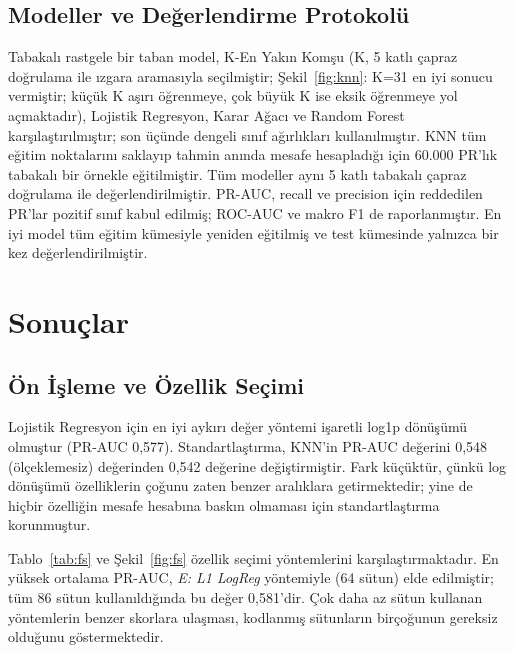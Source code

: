 \documentclass[conference]{IEEEtran}
\begin{document}
\subsection{Modeller ve Değerlendirme Protokolü}
Tabakalı rastgele bir taban model, K-En Yakın Komşu (K, 5 katlı çapraz doğrulama ile ızgara aramasıyla seçilmiştir; Şekil~\ref{fig:knn}: K=31 en iyi sonucu vermiştir; küçük K aşırı öğrenmeye, çok büyük K ise eksik öğrenmeye yol açmaktadır), Lojistik Regresyon, Karar Ağacı ve Random Forest karşılaştırılmıştır; son üçünde dengeli sınıf ağırlıkları kullanılmıştır. KNN tüm eğitim noktalarını saklayıp tahmin anında mesafe hesapladığı için 60.000 PR'lık tabakalı bir örnekle eğitilmiştir. Tüm modeller aynı 5 katlı tabakalı çapraz doğrulama ile değerlendirilmiştir. PR-AUC, recall ve precision için reddedilen PR'lar pozitif sınıf kabul edilmiş; ROC-AUC ve makro F1 de raporlanmıştır. En iyi model tüm eğitim kümesiyle yeniden eğitilmiş ve test kümesinde yalnızca bir kez değerlendirilmiştir.

\section{Sonuçlar}
\subsection{Ön İşleme ve Özellik Seçimi}
Lojistik Regresyon için en iyi aykırı değer yöntemi işaretli log1p dönüşümü olmuştur (PR-AUC 0,577). Standartlaştırma, KNN'in PR-AUC değerini 0,548 (ölçeklemesiz) değerinden 0,542 değerine değiştirmiştir. Fark küçüktür, çünkü log dönüşümü özelliklerin çoğunu zaten benzer aralıklara getirmektedir; yine de hiçbir özelliğin mesafe hesabına baskın olmaması için standartlaştırma korunmuştur.

Tablo~\ref{tab:fs} ve Şekil~\ref{fig:fs} özellik seçimi yöntemlerini karşılaştırmaktadır. En yüksek ortalama PR-AUC, \textit{E: L1 LogReg} yöntemiyle (64 sütun) elde edilmiştir; tüm 86 sütun kullanıldığında bu değer 0,581'dir. Çok daha az sütun kullanan yöntemlerin benzer skorlara ulaşması, kodlanmış sütunların birçoğunun gereksiz olduğunu göstermektedir.
\end{document}
